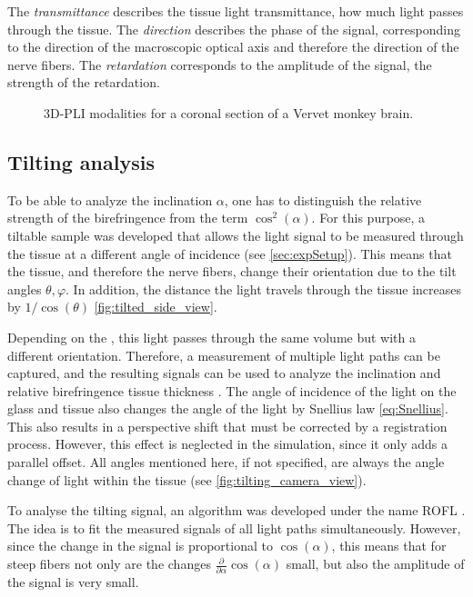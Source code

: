 %
The \textit{transmittance} describes the tissue light transmittance, \ie{} how much light passes through the tissue.
The \textit{direction} describes the phase of the signal, corresponding to the direction of the macroscopic optical axis and therefore the direction of the nerve fibers.
The \textit{retardation} corresponds to the amplitude of the signal, \ie{} the strength of the retardation.
%
\begin{figure}[t]

\caption[3D-PLI modalities]{3D-PLI modalities for a coronal section of a Vervet monkey brain.}
\end{figure}
%
%
\subsection{Tilting analysis} \label{sec::InclAnalysis}
%
To be able to analyze the inclination $\alpha$, one has to distinguish the relative strength of the birefringence from the term $\cos^2(\alpha)$.
For this purpose, a tiltable sample was developed that allows the light signal to be measured through the tissue at a different angle of incidence \cite{Axer2011, Wiese:887678} (see \cref{sec:expSetup}).
This means that the tissue, and therefore the nerve fibers, change their orientation due to the tilt angles $\theta, \varphi$.
In addition, the distance the light travels through the tissue increases by $1/\cos(\theta)$ \cref{fig:tilted_side_view}.
\par
%
Depending on the \Pixelsize{}, this light passes through the same volume but with a different orientation.
Therefore, a measurement of multiple light paths can be captured, and the resulting signals can be used to analyze the inclination and relative birefringence tissue thickness \trel{}.
The angle of incidence of the light on the glass and tissue also changes the angle of the light by Snellius law \cref{eq:Snellius}.
This also results in a perspective shift that must be corrected by a registration process.
However, this effect is neglected in the simulation, since it only adds a parallel offset.
All angles mentioned here, if not specified, are always the angle change of light within the tissue (see \cref{fig:tilting_camera_view}).
\par
%
To analyse the tilting signal, an algorithm was developed under the name \ac{ROFL} \cite{Wiese:887678,Schmitz2018}.
The idea is to fit the measured signals of all light paths simultaneously.
However, since the change in the signal is proportional to $\cos(\alpha)$, this means that for steep fibers not only are the changes $\frac{\partial}{\partial \alpha} \cos(\alpha)$ small, but also the amplitude of the signal is very small.
